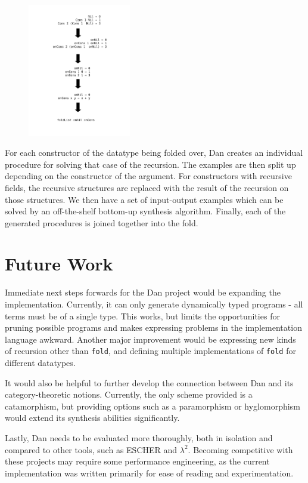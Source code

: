 \documentclass[acmsmall,screen]{acmart}
\begin{document}
\begin{figure}
\includegraphics[width=0.4\textwidth]{Diagram.pdf}
\end{figure}

For each constructor of the datatype being folded over, Dan creates an individual procedure for solving that case of the recursion. The examples are then split up depending on the constructor of the argument. For constructors with recursive fields, the recursive structures are replaced with the result of the recursion on those structures. We then have a set of input-output examples which can be solved by an off-the-shelf bottom-up synthesis algorithm. Finally, each of the generated procedures is joined together into the fold.

\section{Future Work}

Immediate next steps forwards for the Dan project would be expanding the implementation. Currently, it can only generate dynamically typed programs - all terms must be of a single type. This works, but limits the opportunities for pruning possible programs and makes expressing problems in the implementation language awkward. Another major improvement would be expressing new kinds of recursion other than \texttt{fold}, and defining multiple implementations of \texttt{fold} for different datatypes.

It would also be helpful to further develop the connection between Dan and its category-theoretic notions. Currently, the only scheme provided is a catamorphism, but providing options such as a paramorphism or hyglomorphism would extend its synthesis abilities significantly.

Lastly, Dan needs to be evaluated more thoroughly, both in isolation and compared to other tools, such as ESCHER and $\lambda^2$. Becoming competitive with these projects may require some performance engineering, as the current implementation was written primarily for ease of reading and experimentation.
\end{document}
